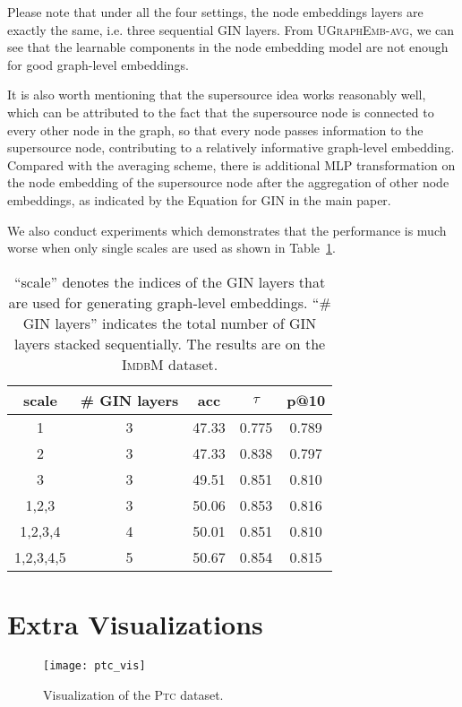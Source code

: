 \documentclass{article}
\newcommand{\model}{\textsc{UGraphEmb}\xspace}
\newcommand{\gin}{\textsc{GIN}\xspace}
\newcommand{\ptc}{\textsc{Ptc}\xspace}
\newcommand{\imdb}{\textsc{ImdbM}\xspace}
\begin{document}
Please note that under all the four settings, the node embeddings layers are exactly the same, i.e. three sequential \gin layers. From \textsc{\model}-\textsc{avg}, we can see that the learnable components in the node embedding model are not enough for good graph-level embeddings. 

It is also worth mentioning that the supersource idea works reasonably well, which can be attributed to the fact that the supersource node is connected to every other node in the graph, so that every node passes information to the supersource node, contributing to a relatively informative graph-level embedding. Compared with the averaging scheme, there is additional MLP transformation on the node embedding of the supersource node after the aggregation of other node embeddings, as indicated by the Equation for \gin in the main paper.

We also conduct experiments which demonstrates that the performance is much worse when only single scales are used as shown in Table~\ref{table:msna_scale}. 

\begin{table}
\begin{tabular}
{ccccc} \hline
\textbf{scale} & \textbf{\# \gin layers} & \textbf{acc} & \textbf{$\tau$} & \textbf{p@10} \\ \hline
1 & 3 & 47.33 & 0.775 & 0.789 \\
2 & 3 & 47.33 & 0.838 & 0.797 \\
3 & 3 & 49.51 & 0.851 & 0.810 \\
1,2,3 & 3 & 50.06 & 0.853 & 0.816 \\
1,2,3,4 & 4 & 50.01 & 0.851 & 0.810 \\
1,2,3,4,5 & 5 & 50.67 & 0.854 & 0.815 \\
\hline
\end{tabular}
\centering
\caption{``scale'' denotes the indices of the \gin layers that are used for generating graph-level embeddings. ``\# \gin layers'' indicates the total number of \gin layers stacked sequentially. The results are on the \imdb dataset.}
\label{table:msna_scale}
\end{table}

 \section{Extra Visualizations}


\begin{figure*}
\centering
\texttt{[image: ptc\_vis]}
\caption{Visualization of the \ptc dataset.}
\label{fig:ptc_vis}
\vspace*{-2mm}
\end{figure*}
\end{document}
